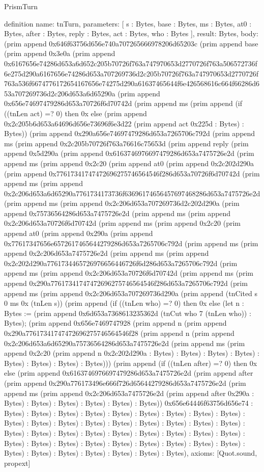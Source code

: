 \begin{lexlean}{PrismTurn}
\begin{semanticmodule}
definition{
  name: tnTurn,
  parameters: [
    s : Bytes,
    base : Bytes,
    ms : Bytes,
    at0 : Bytes,
    after : Bytes,
    reply : Bytes,
    act : Bytes,
    who : Bytes
  ],
  result: Bytes,
  body: (prim append 0x646f63756d656e740a707265666978206d65203c (prim append base (prim append 0x3e0a (prim append 0x6167656e74286d653a6d652c205b70726f763a747970653d2770726f763a506572736f6e275d290a6167656e74286d653a707269736d2c205b70726f763a747970653d2770726f763a536f6674776172654167656e74275d290a61637465644f6e426568616c664f66286d653a707269736d2c206d653a6d65290a (prim append 0x656e74697479286d653a70726f6d70742d (prim append ms (prim append (if ((tnLen act) =? 0) then 0x else (prim append 0x2c205b6d653a64696d656e73696f6e3d22 (prim append act 0x225d : Bytes) : Bytes)) (prim append 0x290a656e74697479286d653a7265706c792d (prim append ms (prim append 0x2c205b70726f763a76616c75653d (prim append reply (prim append 0x5d290a (prim append 0x6163746976697479286d653a7475726e2d (prim append ms (prim append 0x2c20 (prim append at0 (prim append 0x2c202d290a (prim append 0x77617341747472696275746564546f286d653a70726f6d70742d (prim append ms (prim append 0x2c206d653a6d65290a7761734173736f63696174656457697468286d653a7475726e2d (prim append ms (prim append 0x2c206d653a707269736d2c202d290a (prim append 0x75736564286d653a7475726e2d (prim append ms (prim append 0x2c206d653a70726f6d70742d (prim append ms (prim append 0x2c20 (prim append at0 (prim append 0x290a (prim append 0x77617347656e6572617465644279286d653a7265706c792d (prim append ms (prim append 0x2c206d653a7475726e2d (prim append ms (prim append 0x2c202d290a7761734465726976656446726f6d286d653a7265706c792d (prim append ms (prim append 0x2c206d653a70726f6d70742d (prim append ms (prim append 0x290a77617341747472696275746564546f286d653a7265706c792d (prim append ms (prim append 0x2c206d653a707269736d290a (prim append (tnCited s 0 ms 0x (tnLen s)) (prim append (if ((tnLen who) =? 0) then 0x else (let n : Bytes := (prim append 0x6d653a7368613235362d (tnCut who 7 (tnLen who)) : Bytes); (prim append 0x656e7469747928 (prim append n (prim append 0x290a77617341747472696275746564546f28 (prim append n (prim append 0x2c206d653a6d65290a75736564286d653a7475726e2d (prim append ms (prim append 0x2c20 (prim append n 0x2c202d290a : Bytes) : Bytes) : Bytes) : Bytes) : Bytes) : Bytes) : Bytes) : Bytes))) (prim append (if ((tnLen after) =? 0) then 0x else (prim append 0x6163746976697479286d653a7475726e2d (prim append after (prim append 0x290a776173496e666f726d65644279286d653a7475726e2d (prim append ms (prim append 0x2c206d653a7475726e2d (prim append after 0x290a : Bytes) : Bytes) : Bytes) : Bytes) : Bytes) : Bytes)) 0x656e64446f63756d656e74 : Bytes) : Bytes) : Bytes) : Bytes) : Bytes) : Bytes) : Bytes) : Bytes) : Bytes) : Bytes) : Bytes) : Bytes) : Bytes) : Bytes) : Bytes) : Bytes) : Bytes) : Bytes) : Bytes) : Bytes) : Bytes) : Bytes) : Bytes) : Bytes) : Bytes) : Bytes) : Bytes) : Bytes) : Bytes) : Bytes) : Bytes) : Bytes) : Bytes) : Bytes) : Bytes) : Bytes) : Bytes) : Bytes) : Bytes) : Bytes) : Bytes) : Bytes) : Bytes),
  axioms: [Quot.sound, propext]
}


\end{semanticmodule}
\end{lexlean}
